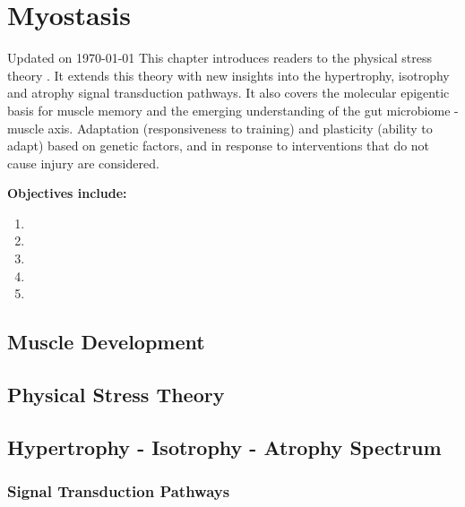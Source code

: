 \chapter{Myostasis}\label{chp:myostasis}
Updated on \today
\minitoc
This chapter introduces readers to the physical stress theory \cite{mueller_tissue_2002}. It extends this theory with new insights into the hypertrophy, isotrophy and atrophy signal transduction pathways. It also covers the molecular epigentic basis for muscle memory and the emerging understanding of the gut microbiome - muscle axis. Adaptation (responsiveness to training) and plasticity (ability to adapt) based on genetic factors, and in response to interventions that do not cause injury are considered.


\vspace{5mm}

\textbf{Objectives include:}
\begin{enumerate}
    \item
    \item
    \item
    \item
    \item
\end{enumerate}

\section{Muscle Development}

\section{Physical Stress Theory}

\section{Hypertrophy - Isotrophy - Atrophy Spectrum}


\subsection{Signal Transduction Pathways}

